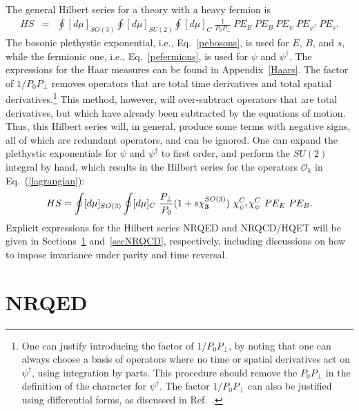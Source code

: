 \documentclass[prd,onecolumn, nofootinbib, 11pt]{revtex4}
\begin{document}
The general Hilbert series for a theory with a heavy fermion is
%
\begin{eqnarray}
HS &=&  \oint [d\mu]_{SO(3)} \oint [d\mu]_{SU(2)}  \oint [d\mu]_{C}~ \frac{1}{P_0 P_\perp} ~PE_E ~PE_B~ PE_\psi ~PE_{\psi^\dagger} ~PE_s   .
\end{eqnarray}
%
The bosonic plethystic exponential, i.e., Eq.~\eqref{pebosons}, is used for $E$, $B$, and $s$, while the fermionic one, i.e., Eq.~\eqref{pefermions}, is used for $\psi$ and $\psi^\dagger$. The expressions for the Haar measures can be found in Appendix~\ref{Haars}.  The factor of $1/P_0P_\perp$ removes operators that are total time derivatives and total spatial derivatives.\footnote{One can justify introducing the factor of $1/P_0P_\perp$,  by noting that one can always choose a basis of operators where no time or spatial derivatives act on $\psi^{\dagger}$, using integration by parts. This procedure should remove the $P_{0}P_{\perp}$ in the definition of the character for $\psi^\dagger$.   The factor $1/P_0P_\perp$ can also be justified using differential forms, as discussed in Ref.~\cite{Henning:2015alf}.}  This method, however, will over-subtract operators that are total derivatives, but which have already been subtracted by the equations of motion.  Thus, this Hilbert series will, in general, produce some terms with negative signs, all of which are redundant operators, and can be ignored.
%
One can expand the plethystic exponentials for $\psi$ and $\psi^\dagger$ to first order, and perform the $SU(2)$ integral by hand, which results in the Hilbert series for the operators $\mathcal{O}_k$ in Eq.~(\ref{lagrangian}):
%
\begin{equation}
HS =  \oint [d\mu]_{SO(3)}   \oint [d\mu]_{C}~ \frac{P_\perp}{P_0 } (1+s\chi_{\bf 3}^{SO(3)}) ~\chi^{C}_{\psi^{\dagger}} \chi^{C}_\psi ~PE_E ~PE_B .
\end{equation}
%
Explicit expressions for the Hilbert series NRQED and NRQCD/HQET will be given in Sections~\ref{secNRQED} and~\ref{secNRQCD}, respectively, including discussions on how to impose invariance under parity and time reversal. 





\section{NRQED}
\label{secNRQED}
\end{document}
